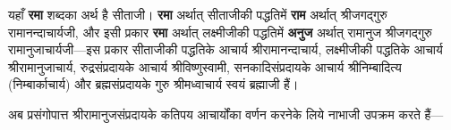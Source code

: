 \begin{sloppypar}\justifying{}
यहाँ \textbf{रमा} शब्दका अर्थ है सीताजी। \textbf{रमा} अर्थात् सीताजीकी पद्धतिमें \textbf{राम} अर्थात् श्रीजगद्गुरु रामानन्दाचार्यजी, और इसी प्रकार \textbf{रमा} अर्थात् लक्ष्मीजीकी पद्धतिमें \textbf{अनुज} अर्थात् रामानुज श्रीजगद्गुरु रामानुजाचार्यजी—इस प्रकार सीताजीकी पद्धतिके आचार्य श्रीरामानन्दाचार्य, लक्ष्मीजीकी पद्धतिके आचार्य श्रीरामानुजाचार्य, रुद्रसंप्रदायके आचार्य श्रीविष्णुस्वामी, सनकादि\-संप्रदायके आचार्य श्रीनिम्बादित्य (निम्बार्काचार्य) और ब्रह्म\-संप्रदायके गुरु श्रीमध्वाचार्य स्वयं ब्रह्माजी हैं।
\end{sloppypar}
\begin{sloppypar}\justifying{}
अब प्रसंगोपात्त श्रीरामानुज\-संप्रदायके कतिपय आचार्योंका वर्णन करनेके लिये नाभाजी उपक्रम करते हैं—
\end{sloppypar}


